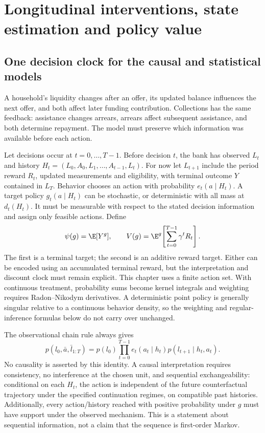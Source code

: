 \chapter{Longitudinal interventions, state estimation and policy value}
\label{r3:longitudinal}
\section{One decision clock for the causal and statistical models}
A household's liquidity changes after an offer, its updated balance
influences the next offer, and both affect later funding contribution.
Collections has the same feedback: assistance changes arrears, arrears
affect subsequent assistance, and both determine repayment. The model
must preserve which information was available before each action.

Let decisions occur at $t=0,\ldots,T-1$. Before decision $t$, the bank
has observed $L_t$ and history
$H_t=(L_0,A_0,L_1,\ldots,A_{t-1},L_t)$. For now let $L_{t+1}$ include
the period reward $R_t$, updated measurements and eligibility, with
terminal outcome $Y$ contained in $L_T$. Behavior chooses an action with
probability $e_t(a\mid H_t)$. A target policy $g_t(a\mid H_t)$ can be
stochastic, or deterministic with all mass at $d_t(H_t)$. It must be
measurable with respect to the stated decision information and assign
only feasible actions. Define
\[
 \psi(g)=\E[Y^g],\qquad
 V(g)=\E^g\!\left[\sum_{t=0}^{T-1}\gamma^tR_t\right].
\]
The first is a terminal target; the second is an additive reward target.
Either can be encoded using an accumulated terminal reward, but the
interpretation and discount clock must remain explicit.
This chapter uses a finite action set. With continuous treatment,
probability sums become kernel integrals and weighting requires
Radon--Nikodym derivatives. A deterministic point policy is generally
singular relative to a continuous behavior density, so the weighting
and regular-inference formulas below do not carry over unchanged.

The observational chain rule always gives
\begin{equation}
 p(l_0,\bar a,\bar l_{1:T})
 =p(l_0)\prod_{t=0}^{T-1}e_t(a_t\mid h_t)
                              p(l_{t+1}\mid h_t,a_t).
 \label{r3:observed-sequence}
\end{equation}
No causality is asserted by this identity. A causal interpretation
requires consistency, no interference at the chosen unit, and sequential
exchangeability: conditional on each $H_t$, the action is independent of
the future counterfactual trajectory under the specified continuation
regimes, on compatible past histories. Additionally, every action/history
reached with positive probability under $g$ must have support under the
observed mechanism. This is a statement about sequential information,
not a claim that the sequence is first-order Markov.

